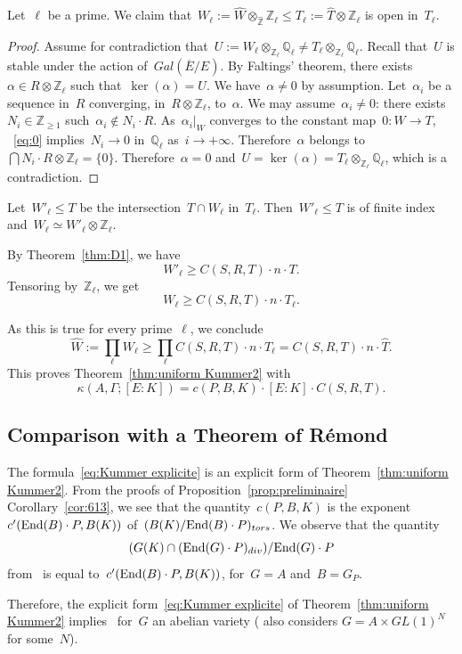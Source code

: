 \documentclass[12pt]{amsart}
\newcommand{\End}{{\rm End}}
\newcommand{\Z}{{\mathbb Z}}
\newcommand{\Q}{{\mathbb Q}}
\newcommand{\ol}{\overline}
\newcommand{\wh}{\widehat}
\newcommand{\tens}{\otimes}
\begin{document}
Let~$\ell$ be a prime. We claim that~$W_\ell:=\wh{W}\tens_{\wh{\Z}}\Z_\ell\leq T_\ell:=\wh{T}\tens\Z_\ell$ is open in~$T_\ell$.
\begin{proof} Assume for contradiction that~$U:=W_\ell\tens_{\Z_\ell} \Q_\ell\neq T_\ell\tens_{\Z_\ell} \Q_\ell$. Recall that~$U$ is stable under the action of~$Gal(\ol{E}/E)$. By Faltings' theorem, there exists~$\alpha\in R\tens \Z_\ell$ such that~$\ker(\alpha)=U$. We have~$\alpha\neq 0$ by assumption.
Let~$\alpha_i$ be a sequence in~$R$ converging, in~$R\tens\Z_\ell$, to~$\alpha$. We may assume~$\alpha_i\neq 0$: there exists~$N_i\in\Z_{\geq1}$ such~$\alpha_i\not\in N_i\cdot R$. As~$\alpha_i|_W$ converges to the constant map~$0:W\to T$, ~\eqref{eq:0} implies~$N_i\to 0$ in~$\Q_\ell$ as~$i\to+\infty$. Therefore~$\alpha$ belongs to~$\bigcap N_i\cdot R\tens\Z_\ell=\{0\}$. Therefore~$\alpha=0$ and~$U=\ker(\alpha)=T_\ell \tens_{\Z_\ell} \Q_\ell$, which is a contradiction.
\end{proof}
Let~$W'_\ell\leq T$ be the intersection~$T\cap W_\ell$ in~$T_\ell$. Then~$W'_\ell\leq T$ is of finite index and~$W_\ell\simeq W'_\ell\tens\Z_\ell$.

By Theorem~\ref{thm:D1}, we have
\[
W'_\ell\geq C(S,R,T)\cdot n\cdot T.
\]
Tensoring by~$\Z_\ell$, we get
\[
W_\ell\geq C(S,R,T)\cdot n\cdot T_\ell.
\]

As this is true for every prime~$\ell$, we conclude
\[
\wh{W}:={\prod}_\ell W_\ell\geq {\prod}_\ell C(S,R,T)\cdot n\cdot T_\ell=C(S,R,T)\cdot n\cdot \wh{T}.
\]
This proves Theorem~\ref{thm:uniform Kummer2} with
\begin{equation}\label{eq:Kummer explicite}
\kappa(A,\Gamma;[E:K])=c(P,B,K)\cdot [E:K]\cdot C(S,R,T).
\end{equation}


\subsection{Comparison with a Theorem of Rémond}\label{sec:CD}
The formula~\eqref{eq:Kummer explicite} is an explicit form of Theorem~\ref{thm:uniform Kummer2}. From the proofs of Proposition~\ref{prop:preliminaire} Corollary~\ref{cor:613}, we see that the quantity~$c(P,B,K)$ is the exponent $c'(\End(B)\cdot P,B(K))$ of~$(B(K)/\End(B)\cdot P)_{tors}$. We observe that the quantity
\[
(G(K)\cap (\End(G)\cdot P)_{div})/\End(G)\cdot P
\] 
from~\cite[Theorem~17 (Rémond)]{CD} is equal to~$c'(\End(B)\cdot P,B(K))$, for~$G=A$ and~$B=G_P$.

Therefore, the explicit form~\eqref{eq:Kummer explicite} of Theorem~\ref{thm:uniform Kummer2} implies~\cite[Theorem~17 (Rémond)]{CD} for~$G$ an abelian variety (\cite{CD} also considers $G=A\times GL(1)^N$ for some~$N$).
\end{document}
